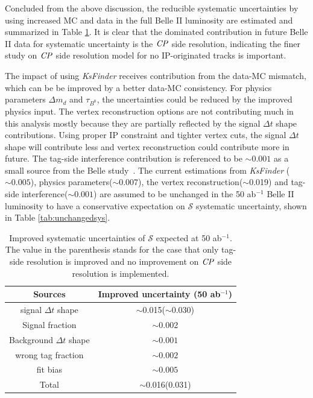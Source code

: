 Concluded from the above discussion, the reducible systematic uncertainties by using increased MC and data in the full Belle II luminosity are estimated and summarized in Table \ref{tab:reducedsys}. It is clear that the dominated contribution in future Belle II data for systematic uncertainty is the $\it{CP}$ side resolution, indicating the finer study on $\it{CP}$ side resolution model for no IP-originated tracks is important.

The impact of using \textit{KsFinder} receives contribution from the data-MC mismatch, which can be be improved by a better data-MC consistency. For physics parameters $\Delta m_d$ and $\tau_{B^0}$, the uncertainties could be reduced by the improved physics input. The vertex reconstruction options are not contributing much in this analysis mostly because they are partially reflected by the signal $\Delta t$ shape contributions. Using proper IP constraint and tighter vertex cuts, the signal $\Delta t$ shape will contribute less and vertex reconstruction could contribute more in future. The tag-side interference contribution is referenced to be $\sim0.001$ as a small source from the Belle study~\cite{yosuke2011measurement}.   The current estimations from \textit{KsFinder} ($\sim0.005$), physics parameters($\sim$0.007), the vertex reconstruction($\sim$0.019) and tag-side interference($\sim0.001$) are assumed to be unchanged in the 50 ab$^{-1}$ Belle II luminosity to have a conservative expectation on $\mathcal{S}$ systematic uncertainty, shown in Table \ref{tab:unchangedsys}.

 
\begin{table}[htpb]
	\centering
	\caption{ Improved systematic uncertainties of $\mathcal{S}$ expected at 50 ab$^{-1}$. The value in the parenthesis stands for the case that only tag-side resolution is improved and no improvement on $\it{CP}$ side resolution is implemented. }
	\label{tab:reducedsys}
	\begin{tabular}{c| c}
		\hline
		Sources & Improved uncertainty (50 ab$^{-1}$) \\
		\hline
		signal $\Delta t$ shape &  $\sim$0.015($\sim$0.030)\\
		Signal fraction &  $\sim$0.002 \\
		Background $\Delta t$ shape &  $\sim0.001$\\
		wrong tag fraction &  $\sim0.002$\\
		fit bias &  $\sim0.005$\\
		\hline
		Total & $\sim$0.016(0.031)\\
		\hline
	\end{tabular}
\end{table}

